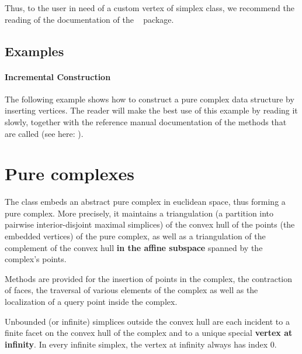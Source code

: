 {\begin{ccAdvanced}
Thus, to the user in need of a custom vertex of simplex class, we recommend
the reading of the documentation of the \cgal\  package.
\end{ccAdvanced}


\subsection{Examples\label{pure_complex:pcds:examples}}
 
\paragraph{Incremental Construction}
The following example shows how to construct a pure complex data structure by
inserting vertices. The reader will make the best use of this example by
reading it slowly, together with the reference manual documentation of the
methods that are called (see here: ).




\section{Pure complexes}

The class  embeds an abstract pure
complex in euclidean space, thus forming a pure complex. More precisely, it
maintains a triangulation (a partition into pairwise interior-disjoint maximal
simplices) of the convex hull of the points (the embedded vertices) of the
pure complex, as well as a triangulation of the complement of the convex hull
\textbf{in the affine subspace} spanned by the complex's points.

Methods are provided for the insertion of points in the complex, the
contraction of faces, the traversal of various elements of the complex
as well as the localization of a query point inside the complex.

Unbounded (or infinite) simplices outside the convex hull are each incident to
a finite facet on the convex hull of the complex and to a unique special
\textbf{vertex at infinity}. In every infinite simplex, the vertex at infinity
always has index $0$.

}
